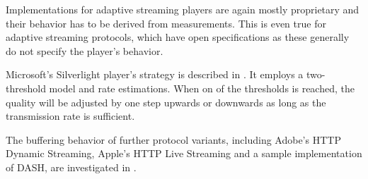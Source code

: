 Implementations for adaptive streaming players are again mostly proprietary and their behavior has to be derived from measurements. This is even true for adaptive streaming protocols, which have open specifications as these generally do not specify the player's behavior.

Microsoft's Silverlight player's strategy is described in \cite{BLTJ:BLTJ20505}. It employs a two-threshold model and rate estimations. When on of the thresholds is reached, the quality will be adjusted by one step upwards or downwards as long as the transmission rate is sufficient.

The buffering behavior of further protocol variants, including Adobe's \gls{HTTP} Dynamic Streaming, Apple's \gls{HTTP} Live Streaming and a sample implementation of \gls{DASH}, are investigated in \cite{Muller:2012:EDA:2151677.2151686,akhshabi2011experimental}.






